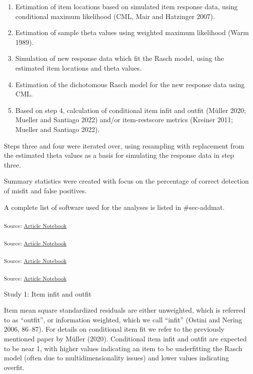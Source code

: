 \documentclass[
  letterpaper,
  DIV=11,
  numbers=noendperiod]{scrartcl}
\providecommand{\tightlist}{%
  \setlength{\itemsep}{0pt}\setlength{\parskip}{0pt}}\usepackage{longtable,booktabs,array}
\begin{document}
\begin{enumerate}
\def\labelenumi{\arabic{enumi}.}
\tightlist
\item
  Estimation of item locations based on simulated item response data,
  using conditional maximum likelihood (CML, Mair and Hatzinger 2007).
\item
  Estimation of sample theta values using weighted maximum likelihood
  (Warm 1989).
\item
  Simulation of new response data which fit the Rasch model, using the
  estimated item locations and theta values.
\item
  Estimation of the dichotomous Rasch model for the new response data
  using CML.
\item
  Based on step 4, calculation of conditional item infit and outfit
  (Müller 2020; Mueller and Santiago 2022) and/or item-restscore metrics
  (Kreiner 2011; Mueller and Santiago 2022).
\end{enumerate}

Steps three and four were iterated over, using resampling with
replacement from the estimated theta values as a basis for simulating
the response data in step three.

Summary statistics were created with focus on the percentage of correct
detection of misfit and false positives.

A complete list of software used for the analyses is listed in
\#sec-addmat.

\textsubscript{Source:
\href{https://pgmj.github.io/rasch_itemfit/index.qmd.html}{Article
Notebook}}

\textsubscript{Source:
\href{https://pgmj.github.io/rasch_itemfit/index.qmd.html}{Article
Notebook}}

\textsubscript{Source:
\href{https://pgmj.github.io/rasch_itemfit/index.qmd.html}{Article
Notebook}}

\textsubscript{Source:
\href{https://pgmj.github.io/rasch_itemfit/index.qmd.html}{Article
Notebook}}

Study 1: Item infit and outfit

Item mean square standardized residuals are either unweighted, which is
referred to as ``outfit'', or information weighted, which we call
``infit'' (Ostini and Nering 2006, 86--87). For details on conditional
item fit we refer to the previously mentioned paper by Müller (2020).
Conditional item infit and outfit are expected to be near 1, with higher
values indicating an item to be underfitting the Rasch model (often due
to multidimensionality issues) and lower values indicating overfit.
\end{document}
